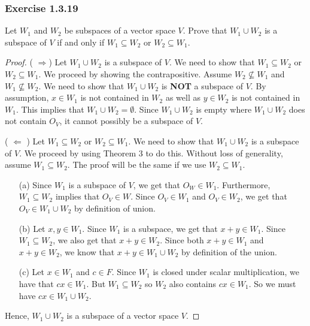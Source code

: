\subsubsection{Exercise 1.3.19} Let \( W_{1}  \) and \( W_{2}  \) be subspaces of a vector space \( V  \). Prove that \( W_{1} \cup W_{2}  \) is a subspace of \( V  \) if and only if \( W_{1} \subseteq W_{2}  \) or \(  W_{2} \subseteq W_{1}  \).
\begin{proof}
    ( \( \Rightarrow \)) Let \( W_{1} \cup W_{2}  \) is a subspace of \( V  \). We need to show that \( W_{1} \subseteq W_{2}  \) or \( W_{2} \subseteq W_{1}  \). We proceed by showing the contrapositive. Assume \( W_{2} \not\subseteq W_{1}  \) and \( W_{1} \not\subseteq W_{2}   \). We need to show that \( W_{1} \cup W_{2}  \) is \textbf{NOT} a subspace of \( V  \).  By assumption, \( x \in W_{1}  \) is not contained in \( W_{2}  \) as well as \( y \in W_{2}  \) is not contained in \( W_{1} \). This implies that \( W_{1} \cup W_{2} = \emptyset \). Since \( W_{1} \cup W_{2}  \) is empty where \( W_{1} \cup W_{2}  \) does not contain \( O_{V} \), it cannot possibly be a subspace of \( V  \).

    ( \(\Leftarrow \) ) Let \( W_{1} \subseteq W_{2}  \) or \( W_{2} \subseteq W_{1}  \). We need to show that \( W_{1} \cup W_{2}  \) is a subspace of \( V  \). We proceed by using Theorem 3 to do this. Without loss of generality, assume \( W_{1} \subseteq W_{2}  \). The proof will be the same if we use \( W_{2} \subseteq W_{1} \).
    \begin{enumerate}
        \item[(a)] Since \( W_{1}  \) is a subspace of \( V \), we get that \( O_{W} \in W_{1}   \). Furthermore, \( W_{1} \subseteq W_{2}  \) implies that \( O_{V} \in W  \). Since \( O_{V} \in W_{1}  \) and \( O_{V} \in W_{2} \), we get that \( O_{V} \in W_{1} \cup W_{2}  \) by definition of union.
        \item[(b)] Let \( x,y \in W_{1}  \). Since \( W_{1}  \) is a subspace, we get that \( x + y \in W_{1}  \). Since \( W_{1} \subseteq W_{2}  \), we also get that \( x + y \in W_{2} \).
            Since both \( x + y \in W_{1}   \)  and \( x+y \in W_{2}  \), we know that \( x+ y \in W_{1} \cup W_{2}  \) by definition of the union.
        \item[(c)] Let \( x \in W_{1}   \) and \( c \in F  \). Since \( W_{1}  \) is closed under scalar multiplication, we have that \( cx \in W_{1}  \). But \( W_{1} \subseteq W_{2}  \) so \( W_{2}  \) also contains \( cx \in W_{1} \). So we must have \( cx \in W_{1} \cup W_{2} \).
    \end{enumerate}
    Hence,  \( W_{1} \cup W_{2}    \) is a subspace of a vector space \( V \).
\end{proof}

